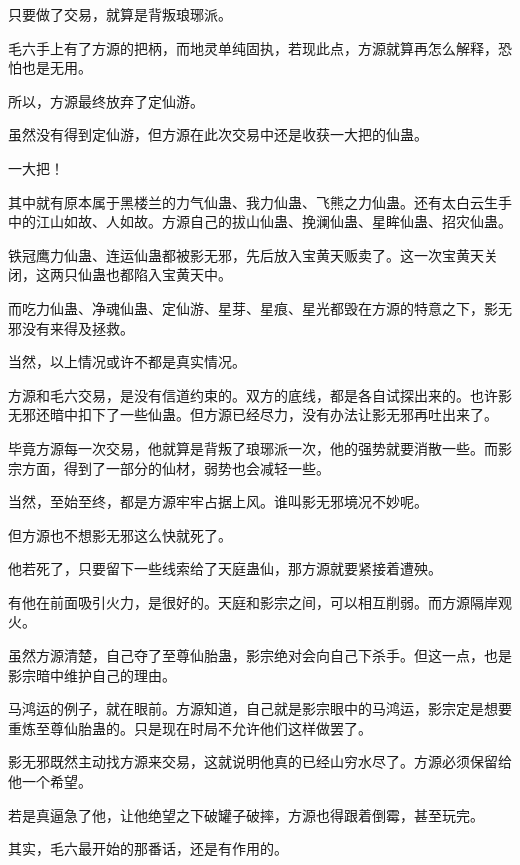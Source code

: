 \begin{this_body}
只要做了交易，就算是背叛琅琊派。

毛六手上有了方源的把柄，而地灵单纯固执，若现此点，方源就算再怎么解释，恐怕也是无用。

所以，方源最终放弃了定仙游。

虽然没有得到定仙游，但方源在此次交易中还是收获一大把的仙蛊。

一大把！

其中就有原本属于黑楼兰的力气仙蛊、我力仙蛊、飞熊之力仙蛊。还有太白云生手中的江山如故、人如故。方源自己的拔山仙蛊、挽澜仙蛊、星眸仙蛊、招灾仙蛊。

铁冠鹰力仙蛊、连运仙蛊都被影无邪，先后放入宝黄天贩卖了。这一次宝黄天关闭，这两只仙蛊也都陷入宝黄天中。

而吃力仙蛊、净魂仙蛊、定仙游、星芽、星痕、星光都毁在方源的特意之下，影无邪没有来得及拯救。

当然，以上情况或许不都是真实情况。

方源和毛六交易，是没有信道约束的。双方的底线，都是各自试探出来的。也许影无邪还暗中扣下了一些仙蛊。但方源已经尽力，没有办法让影无邪再吐出来了。

毕竟方源每一次交易，他就算是背叛了琅琊派一次，他的强势就要消散一些。而影宗方面，得到了一部分的仙材，弱势也会减轻一些。

当然，至始至终，都是方源牢牢占据上风。谁叫影无邪境况不妙呢。

但方源也不想影无邪这么快就死了。

他若死了，只要留下一些线索给了天庭蛊仙，那方源就要紧接着遭殃。

有他在前面吸引火力，是很好的。天庭和影宗之间，可以相互削弱。而方源隔岸观火。

虽然方源清楚，自己夺了至尊仙胎蛊，影宗绝对会向自己下杀手。但这一点，也是影宗暗中维护自己的理由。

马鸿运的例子，就在眼前。方源知道，自己就是影宗眼中的马鸿运，影宗定是想要重炼至尊仙胎蛊的。只是现在时局不允许他们这样做罢了。

影无邪既然主动找方源来交易，这就说明他真的已经山穷水尽了。方源必须保留给他一个希望。

若是真逼急了他，让他绝望之下破罐子破摔，方源也得跟着倒霉，甚至玩完。

其实，毛六最开始的那番话，还是有作用的。

\end{this_body}

